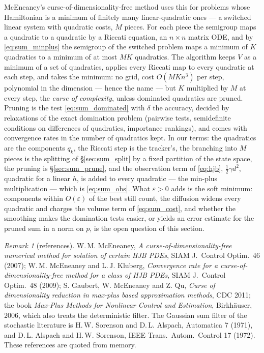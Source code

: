 \documentclass[11pt,a4paper]{article}
\newcommand{\eps}{\varepsilon}
\theoremstyle{plain}
\theoremstyle{definition}
\theoremstyle{remark}
\newtheorem{remark}{Remark}
\begin{document}
McEneaney's curse-of-dimensionality-free method uses this for problems whose Hamiltonian is a minimum of finitely many linear-quadratic ones --- a switched linear system with quadratic costs, $M$ pieces. For each piece the semigroup maps a quadratic to a quadratic by a Riccati equation, an $n\times n$ matrix ODE, and by \eqref{eq:sum_minplus} the semigroup of the switched problem maps a minimum of $K$ quadratics to a minimum of at most $MK$ quadratics. The algorithm keeps $V$ as a minimum of a set of quadratics, applies every Riccati map to every quadratic at each step, and takes the minimum: no grid, cost $O(MKn^3)$ per step, polynomial in the dimension --- hence the name --- but $K$ multiplied by $M$ at every step, the \emph{curse of complexity}, unless dominated quadratics are pruned. Pruning is the test \eqref{eq:sum_dominated} with $\delta$ the accuracy, decided by relaxations of the exact domination problem (pairwise tests, semidefinite conditions on differences of quadratics, importance rankings), and comes with convergence rates in the number of quadratics kept. In our terms: the quadratics are the components $q_k$, the Riccati step is the tracker's, the branching into $M$ pieces is the splitting of \S\ref{sec:sum_split} by a fixed partition of the state space, the pruning is \S\ref{sec:sum_prune}, and the observation term of \eqref{eq:hjb}, $\tfrac12\gamma d^2$, quadratic for a linear $h$, is added to every quadratic --- the min-plus multiplication --- which is \eqref{eq:sum_obs}. What $\eps>0$ adds is the soft minimum: components within $O(\eps)$ of the best still count, the diffusion widens every quadratic and charges the volume term of \eqref{eq:sum_cost}, and whether the smoothing makes the domination tests easier, or yields an error estimate for the pruned sum in a norm on $p$, is the open question of this section.

\begin{remark}[references]
W.\,M. McEneaney, \emph{A curse-of-dimensionality-free numerical method for solution of certain HJB PDEs}, SIAM J.\ Control Optim.\ 46 (2007); W.\,M. McEneaney and L.\,J. Kluberg, \emph{Convergence rate for a curse-of-dimensionality-free method for a class of HJB PDEs}, SIAM J.\ Control Optim.\ 48 (2009); S. Gaubert, W. McEneaney and Z. Qu, \emph{Curse of dimensionality reduction in max-plus based approximation methods}, CDC 2011; the book \emph{Max-Plus Methods for Nonlinear Control and Estimation}, Birkh\"auser, 2006, which also treats the deterministic filter. The Gaussian sum filter of the stochastic literature is H.\,W. Sorenson and D.\,L. Alspach, Automatica 7 (1971), and D.\,L. Alspach and H.\,W. Sorenson, IEEE Trans.\ Autom.\ Control 17 (1972). These references are quoted from memory.
\end{remark}
\end{document}
